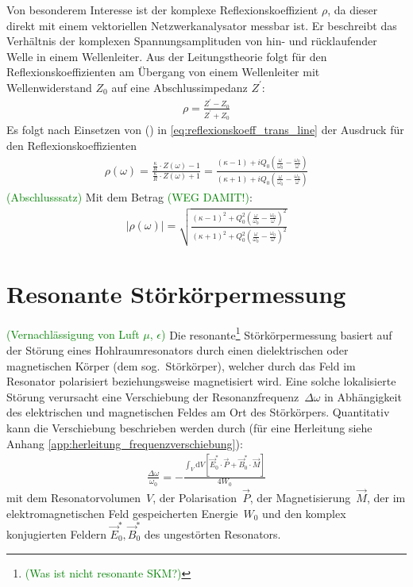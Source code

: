 \documentclass[11pt, a4paper]{scrbook}
\newcommand{\ve}{\vec{E}}
\newcommand{\vb}{\vec{B}}
\newcommand{\todo}[1]{{\textcolor{Green}{(#1)}}}
\begin{document}
	Von besonderem Interesse ist der komplexe Reflexionskoeffizient $\rho$, da dieser direkt mit einem vektoriellen Netzwerkanalysator messbar ist.
	Er beschreibt das Verhältnis der komplexen Spannungsamplituden von hin- und rücklaufender Welle in einem Wellenleiter.
	Aus der Leitungstheorie \cite{pozar} folgt für den Reflexionskoeffizienten am Übergang von einem Wellenleiter mit Wellenwiderstand $Z_0$ auf eine Abschlussimpedanz $Z^\prime$:
	\begin{align}
		\rho = \frac{Z^\prime - Z_0}{Z^\prime + Z_0}
		\label{eq:reflexionskoeff_trans_line}
	\end{align}
	Es folgt nach Einsetzen von () in \eqref{eq:reflexionskoeff_trans_line} der Ausdruck für den Reflexionskoeffizienten 
	\begin{align}
		\rho(\omega) = \frac{\frac{\kappa}{R} \cdot Z(\omega) - 1}{\frac{\kappa}{R} \cdot Z(\omega) + 1} = \frac{(\kappa - 1) + i  Q_0 \left( \frac{\omega}{\omega_0}  - \frac{\omega_0}{\omega}\right)}{\left( \kappa + 1 \right) + i  Q_0 \left( \frac{\omega}{\omega_0}  - \frac{\omega_0}{\omega}\right)}
	\end{align}
	\todo{Abschlusssatz}
	Mit dem Betrag \todo{WEG DAMIT!}:
	\begin{align}
		| \rho(\omega) | = \sqrt{\frac{(\kappa - 1)^2 + Q_0^2 \left( \frac{\omega}{\omega_0}  - \frac{\omega_0}{\omega}\right)^2}{(\kappa + 1)^2 + Q_0^2 \left( \frac{\omega}{\omega_0}  - \frac{\omega_0}{\omega}\right)^2}}
	\end{align}

	\section{Resonante Störkörpermessung}
	\todo{Vernachlässigung von Luft $\mu$, $\epsilon$}
	Die resonante\footnote{\todo{Was ist nicht resonante SKM?}} Störkörpermessung basiert auf der Störung eines Hohlraumresonators durch einen dielektrischen oder magnetischen Körper (dem sog.\ Störkörper), welcher durch das Feld im Resonator polarisiert beziehungsweise magnetisiert wird.
	Eine solche lokalisierte Störung verursacht eine Verschiebung der Resonanzfrequenz~$\Delta \omega$ in Abhängigkeit des elektrischen und magnetischen Feldes am Ort des Störkörpers.
	Quantitativ kann die Verschiebung beschrieben werden durch (für eine Herleitung siehe Anhang \ref{app:herleitung_frequenzverschiebung}):
	\begin{align}
		\frac{\Delta \omega}{\omega_0} = - \frac{\int_V \mathrm{d}V \left[ \ve_0^* \cdot \vec{P} + \vb_0^* \cdot \vec{M} \right]}{4 W_0}
		\label{eq:frequenzverschiebung}
	\end{align}
	mit dem Resonatorvolumen~$V$, der Polarisation~$\vec{P}$, der Magnetisierung~$\vec{M}$, der im elektromagnetischen Feld gespeicherten Energie~$W_0$ und den komplex konjugierten Feldern $\ve_0^*, \vb_0^*$ des ungestörten Resonators.
	
\end{document}
